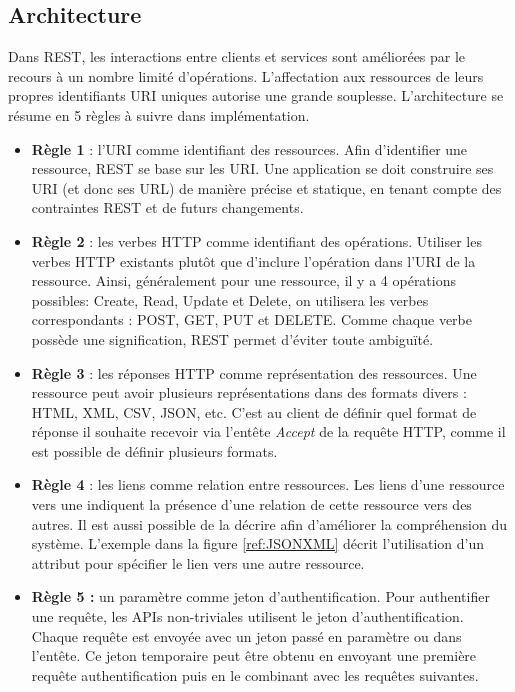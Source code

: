 \subsection{Architecture}
Dans REST, les interactions entre clients et services sont améliorées par le recours à un nombre limité d'opérations. L'affectation aux ressources de leurs propres identifiants URI uniques autorise une grande souplesse. L'architecture se résume en 5 règles à suivre dans implémentation.\cite{refRegles}
\begin{itemize}
	\item \textbf{Règle 1} : l'URI comme identifiant des ressources.\newline
	      Afin d'identifier une ressource, REST se base sur les URI. Une application se doit construire ses URI (et donc ses URL) de manière précise et statique, en tenant compte des contraintes REST et de futurs changements.
	\item \textbf{Règle 2} : les verbes HTTP comme identifiant des opérations.\newline
	      Utiliser les verbes HTTP existants plutôt que d'inclure l'opération dans l'URI de la ressource. Ainsi, généralement pour une ressource, il y a 4 opérations possibles: Create, Read, Update et Delete, on utilisera les verbes correspondants : POST, GET, PUT et DELETE.
	      Comme chaque verbe possède une signification, REST permet d'éviter toute ambiguïté.
	\item \textbf{Règle 3} : les réponses HTTP comme représentation des ressources.\newline
	      Une ressource peut avoir plusieurs représentations dans des formats divers : HTML, XML, CSV, JSON, etc. C'est au client de définir quel format de réponse il souhaite recevoir via l'entête \emph{Accept} de la requête HTTP, comme il est possible de définir plusieurs formats.
	\item \textbf{Règle 4} : les liens comme relation entre ressources.\newline
	Les liens d'une ressource vers une indiquent la présence d'une relation de cette ressource vers des autres. Il est aussi possible de la décrire afin d'améliorer la compréhension du système.
	L'exemple dans la figure \ref{ref:JSONXML} décrit l'utilisation d'un attribut pour spécifier le lien vers une autre ressource.
	
	\item \textbf{Règle 5 :} un paramètre comme jeton d'authentification.\newline
	      Pour authentifier une requête, les APIs non-triviales utilisent le jeton d'authentification. Chaque requête est envoyée avec un jeton passé en paramètre ou dans l'entête. Ce jeton temporaire peut être obtenu en envoyant une première requête authentification puis en le combinant avec les requêtes suivantes.
\end{itemize}
